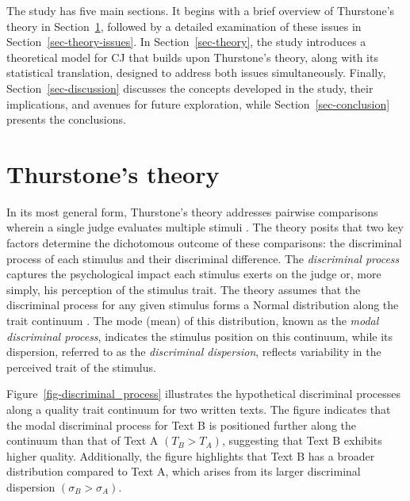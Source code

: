 \documentclass[
  authoryear,
  review,
  1p]{elsarticle}
\begin{document}
The study has five main sections. It begins with a brief overview of
Thurstone's theory in Section~\ref{sec-thurstone_theory}, followed by a
detailed examination of these issues in Section~\ref{sec-theory-issues}.
In Section~\ref{sec-theory}, the study introduces a theoretical model
for CJ that builds upon Thurstone's theory, along with its statistical
translation, designed to address both issues simultaneously. Finally,
Section~\ref{sec-discussion} discusses the concepts developed in the
study, their implications, and avenues for future exploration, while
Section~\ref{sec-conclusion} presents the conclusions.

\section{Thurstone's theory}\label{sec-thurstone_theory}

In its most general form, Thurstone's theory addresses pairwise
comparisons wherein a single judge evaluates multiple stimuli
\citep[pp.~267]{Thurstone_1927b}. The theory posits that two key factors
determine the dichotomous outcome of these comparisons: the discriminal
process of each stimulus and their discriminal difference. The
\emph{discriminal process} captures the psychological impact each
stimulus exerts on the judge or, more simply, his perception of the
stimulus trait. The theory assumes that the discriminal process for any
given stimulus forms a Normal distribution along the trait continuum
\citep[pp.~266]{Thurstone_1927b}. The mode (mean) of this distribution,
known as the \emph{modal discriminal process}, indicates the stimulus
position on this continuum, while its dispersion, referred to as the
\emph{discriminal dispersion}, reflects variability in the perceived
trait of the stimulus.

Figure~\ref{fig-discriminal_process} illustrates the hypothetical
discriminal processes along a quality trait continuum for two written
texts. The figure indicates that the modal discriminal process for Text
B is positioned further along the continuum than that of Text A
\((T_{B} > T_{A})\), suggesting that Text B exhibits higher quality.
Additionally, the figure highlights that Text B has a broader
distribution compared to Text A, which arises from its larger
discriminal dispersion \((\sigma_{B} > \sigma_{A})\).
\end{document}
